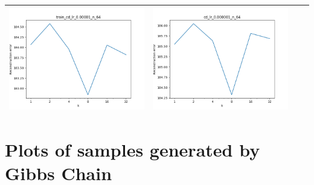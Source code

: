 \documentclass[12pt]{report}
\begin{document}
\begin{table}[H]
\begin{tabular}{ | c | c | c | c |}
\begin{minipage}{.3\textwidth}
      \includegraphics[scale=0.25]{train_cd_lr_0_00001_n_64.png}
    \end{minipage} &
    \begin{minipage}{.3\textwidth}
      \includegraphics[scale=0.25]{cd_lr_0_00001_n_64.png}
    \end{minipage}
    \\ \hline
  \end{tabular}
\end{table}
\section{Plots of samples generated by Gibbs Chain}
\end{document}
